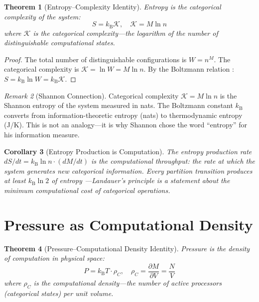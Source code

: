 \documentclass[twocolumn,10pt,a4paper]{article}
\theoremstyle{plain}
\newtheorem{theorem}{Theorem}[section]
\newtheorem{corollary}[theorem]{Corollary}
\theoremstyle{definition}
\theoremstyle{remark}
\newtheorem{remark}[theorem]{Remark}
\newcommand{\kB}{k_{\mathrm{B}}}
\begin{document}
\begin{theorem}[Entropy--Complexity Identity]
\label{thm:entropy_complexity}
Entropy is the categorical complexity of the system:
\begin{equation}
\boxed{S = \kB \mathcal{K}, \quad \mathcal{K} = M \ln n}
\end{equation}
where $\mathcal{K}$ is the categorical complexity---the logarithm of the number of distinguishable computational states.
\end{theorem}

\begin{proof}
The total number of distinguishable configurations is $W = n^M$. The categorical complexity is $\mathcal{K} = \ln W = M \ln n$. By the Boltzmann relation \cite{boltzmann1877}: $S = \kB \ln W = \kB \mathcal{K}$.
\end{proof}

\begin{remark}[Shannon Connection]
Categorical complexity $\mathcal{K} = M \ln n$ is the Shannon entropy \cite{shannon1948} of the system measured in nats. The Boltzmann constant $\kB$ converts from information-theoretic entropy (nats) to thermodynamic entropy (J/K). This is not an analogy---it is why Shannon chose the word ``entropy'' for his information measure.
\end{remark}

\begin{corollary}[Entropy Production is Computation]
The entropy production rate $dS/dt = \kB \ln n \cdot (dM/dt)$ is the computational throughput: the rate at which the system generates new categorical information. Every partition transition produces at least $\kB \ln 2$ of entropy \cite{landauer1961}---Landauer's principle is a statement about the minimum computational cost of categorical operations.
\end{corollary}

\section{Pressure as Computational Density}
\label{sec:pressure_density}

\begin{theorem}[Pressure--Computational Density Identity]
\label{thm:pressure_density}
Pressure is the density of computation in physical space:
\begin{equation}
\boxed{P = \kB T \cdot \rho_C, \quad \rho_C = \frac{\partial M}{\partial V} = \frac{N}{V}}
\end{equation}
where $\rho_C$ is the computational density---the number of active processors (categorical states) per unit volume.
\end{theorem}
\end{document}
